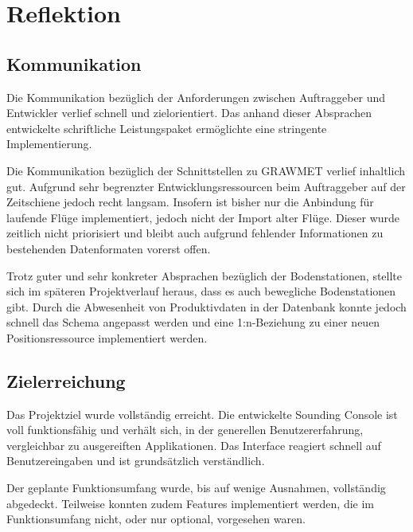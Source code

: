 \section{Reflektion}

\subsection{Kommunikation}
Die Kommunikation bezüglich der Anforderungen zwischen Auftraggeber und Entwickler verlief schnell und zielorientiert.
Das anhand dieser Absprachen entwickelte schriftliche Leistungspaket ermöglichte eine stringente Implementierung.

Die Kommunikation bezüglich der Schnittstellen zu GRAWMET verlief inhaltlich gut.
Aufgrund sehr begrenzter Entwicklungsressourcen beim Auftraggeber auf der Zeitschiene jedoch recht langsam.
Insofern ist bisher nur die Anbindung für laufende Flüge implementiert, jedoch nicht der Import alter Flüge.
Dieser wurde zeitlich nicht priorisiert und bleibt auch aufgrund fehlender Informationen zu bestehenden Datenformaten vorerst offen.

Trotz guter und sehr konkreter Absprachen bezüglich der Bodenstationen, stellte sich im späteren Projektverlauf heraus, dass es auch bewegliche Bodenstationen gibt.
Durch die Abwesenheit von Produktivdaten in der Datenbank konnte jedoch schnell das Schema angepasst werden und eine 1:n-Beziehung zu einer neuen Positionsressource implementiert werden.

\subsection{Zielerreichung}
Das Projektziel wurde vollständig erreicht.
Die entwickelte Sounding Console ist voll funktionsfähig und verhält sich, in der generellen Benutzererfahrung, vergleichbar zu ausgereiften Applikationen.
Das Interface reagiert schnell auf Benutzereingaben und ist grundsätzlich verständlich.

Der geplante Funktionsumfang wurde, bis auf wenige Ausnahmen, vollständig abgedeckt.
Teilweise konnten zudem Features implementiert werden, die im Funktionsumfang nicht, oder nur optional, vorgesehen waren.
